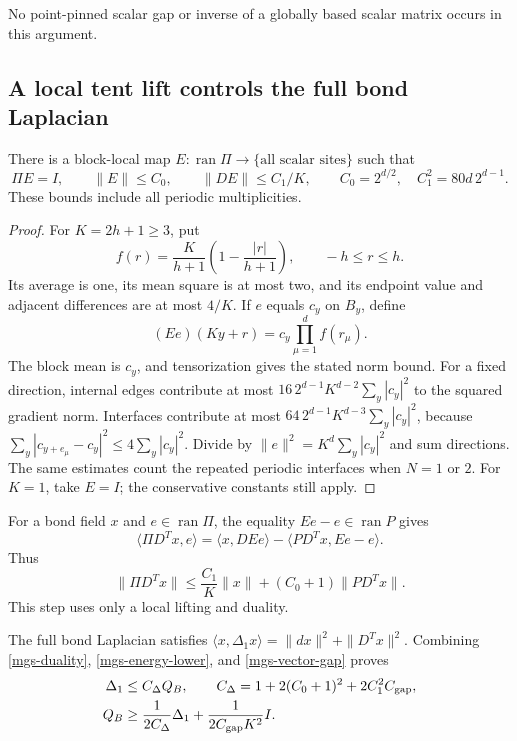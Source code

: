 No point-pinned scalar gap or inverse of a globally based scalar
matrix occurs in this argument.

\subsection{A local tent lift controls the full bond Laplacian}
\label{mgs-tent-section}

\begin{lemma}
\label{mgs-tent-lemma}
There is a block-local map \(E:\operatorname{ran}\Pi\to
\{\text{all scalar sites}\}\) such that
\begin{equation}
 \Pi E=I,\qquad \|E\|\le C_0,\qquad
 \|DE\|\le C_1/K,\qquad
 C_0=2^{d/2},\quad C_1^2=80d\,2^{d-1}.
 \label{mgs-tent-bounds}
\end{equation}
These bounds include all periodic multiplicities.
\end{lemma}

\begin{proof}
For \(K=2h+1\ge3\), put
\[
 f(r)=\frac K{h+1}\left(1-\frac{|r|}{h+1}\right),
 \qquad -h\le r\le h.
\]
Its average is one, its mean square is at most two, and its
endpoint value and adjacent differences are at most \(4/K\).
If \(e\) equals \(c_y\) on \(B_y\), define
\[
 (Ee)(Ky+r)=c_y\prod_{\mu=1}^d f(r_\mu).
\]
The block mean is \(c_y\), and tensorization gives the stated
norm bound. For a fixed direction, internal edges contribute
at most
\(16\,2^{d-1}K^{d-2}\sum_y|c_y|^2\)
to the squared gradient norm.
Interfaces contribute at most
\(64\,2^{d-1}K^{d-3}\sum_y|c_y|^2\), because
\(\sum_y|c_{y+e_\mu}-c_y|^2\le4\sum_y|c_y|^2\).
Divide by
\(\|e\|^2=K^d\sum_y|c_y|^2\) and sum directions.
The same estimates count the repeated periodic interfaces when
\(N=1\) or \(2\).
For \(K=1\), take \(E=I\); the conservative constants still apply.
\end{proof}

For a bond field \(x\) and \(e\in\operatorname{ran}\Pi\),
the equality \(Ee-e\in\operatorname{ran}P\) gives
\[
 \langle\Pi D^Tx,e\rangle
  =\langle x,DEe\rangle-\langle PD^Tx,Ee-e\rangle.
\]
Thus
\begin{equation}
 \|\Pi D^Tx\|
 \le\frac{C_1}{K}\|x\|+(C_0+1)\|PD^Tx\|.
 \label{mgs-duality}
\end{equation}
This step uses only a local lifting and duality.

The full bond Laplacian satisfies
\(\langle x,\Delta_1x\rangle=\|dx\|^2+\|D^Tx\|^2\).
Combining \eqref{mgs-duality},
\eqref{mgs-energy-lower}, and \eqref{mgs-vector-gap}
proves
\begin{equation}
 \begin{split}
 \Delta_1&\le C_\Delta Q_B,\qquad
 C_\Delta=1+2(C_0+1)^2+2C_1^2C_{\rm gap},\\
 Q_B&\ge \frac1{2C_\Delta}\Delta_1
                         +\frac1{2C_{\rm gap}K^2}I.
 \end{split}
 \label{mgs-laplacian-domination}
\end{equation}

